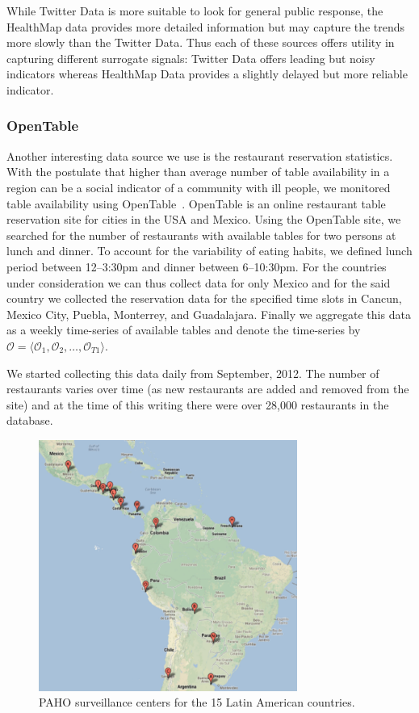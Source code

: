 While Twitter Data is more suitable to look for general public response, the
HealthMap data provides more detailed information but may capture the trends
more slowly than the Twitter Data. Thus each of these sources offers utility in
capturing different surrogate signals: Twitter Data offers leading but noisy
indicators whereas HealthMap Data provides a slightly delayed but more reliable
indicator.

\subsubsection{OpenTable}
Another interesting data source we use is the
restaurant reservation statistics.  With the postulate that higher than average
number of table availability in a region can be a social indicator of a
community with ill people, we monitored table availability using
OpenTable~\cite{Opentable:2013}. OpenTable is an online restaurant table
reservation site for cities in the USA and Mexico.  Using the OpenTable site,
we searched for the number of restaurants with available tables for two persons
at lunch and dinner. To account for the variability of eating habits, we
defined lunch period between 12–3:30pm and dinner between 6–10:30pm. For the
countries under consideration we can thus collect data for only Mexico and for
the said country we collected the reservation data for the specified time slots
in Cancun, Mexico City, Puebla, Monterrey, and Guadalajara. Finally we
aggregate this data as a weekly time-series of available tables and denote the
time-series by 
$\mathcal{O} = \langle \mathcal{O}_1, \mathcal{O}_2, \dots, \mathcal{O}_{T1} \rangle$.

We started collecting this data daily from September, 2012. The number of
restaurants varies over time (as new restaurants are added and removed from the
site) and at the time of this writing there were over 28,000 restaurants in the
database.
\begin{figure} 
  \includegraphics[width=3.33in]{fig/humidity_centers.pdf}
  \caption{\label{fig:surveillance} PAHO surveillance centers for the 15 Latin
  American countries.}
\end{figure}


